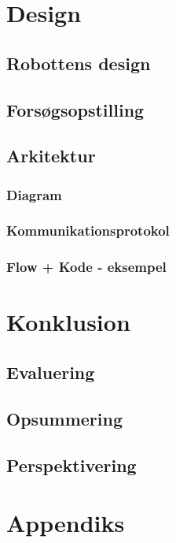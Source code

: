 \part{Design}
\chapter{Robottens design}


\chapter{Forsøgsopstilling}

\chapter{Arkitektur}

\section{Diagram}
\section{Kommunikationsprotokol}\label{kommunikation}

\section{Flow + Kode - eksempel}


\part{Konklusion}
\chapter{Evaluering}
\chapter{Opsummering}
\chapter{Perspektivering}

\appendix
\part{Appendiks}



